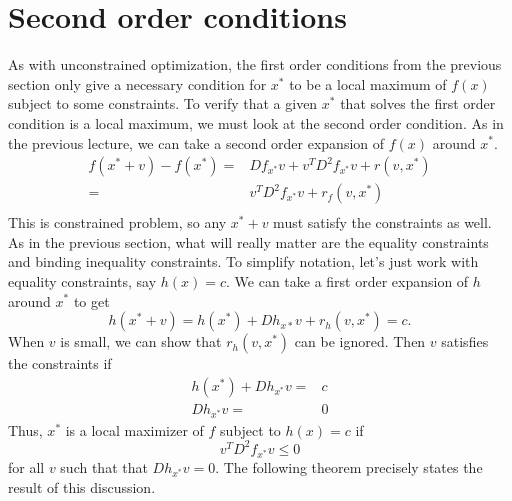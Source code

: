\documentclass[12pt,reqno]{amsart}
\theoremstyle{definition}
\begin{document}
\section{Second order conditions}

As with unconstrained optimization, the first order conditions from
the previous section only give a necessary condition for $x^*$ to be a
local maximum of $f(x)$ subject to some constraints. To verify that a
given $x^*$ that solves the first order condition is a local maximum,
we must look at the second order condition. As in the previous
lecture, we can take a second order expansion of $f(x)$ around $x^*$. 
\begin{align*}
  f(x^*+v) - f(x^*) = & Df_{x^*} v + v^T D^2 f_{x^*}
  v + r(v,x^*) \\
  = & v^T D^2 f_{x^*} v + r_f(v,x^*) \\
\end{align*}
This is constrained problem, so any $x^* + v$ must satisfy the
constraints as well. As in the previous section, what will really
matter are the equality constraints and binding inequality
constraints. To simplify notation, let's just work with equality
constraints, say $h(x)=c$. We can take a first order expansion of $h$
around $x^*$ to get
\[ h(x^* + v) = h(x^*) + Dh_{x*} v + r_h(v,x^*) = c. \]
When $v$ is small, we can show that $r_h(v,x^*)$ can be
ignored. Then $v$ satisfies the constraints if
\begin{align*}
  h(x^*) + Dh_{x^*} v = & c \\
  Dh_{x^*} v = & 0
\end{align*}
Thus, $x^*$ is a local maximizer of $f$ subject to $h(x) = c$ if
\[ v^T D^2 f_{x^*} v \leq 0 \] for all $v$ such that that $Dh_{x^*} v
= 0$. The following theorem precisely states the result of this
discussion.
\end{document}
